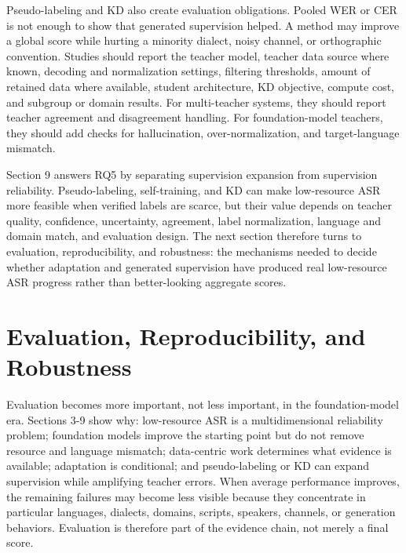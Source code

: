 \documentclass[pdflatex,sn-basic]{sn-jnl}
\theoremstyle{thmstyleone}
\theoremstyle{thmstyletwo}
\theoremstyle{thmstylethree}
\begin{document}
Pseudo-labeling and KD also create evaluation obligations. Pooled WER or CER is not enough to show that generated supervision helped. A method may improve a global score while hurting a minority dialect, noisy channel, or orthographic convention. Studies should report the teacher model, teacher data source where known, decoding and normalization settings, filtering thresholds, amount of retained data where available, student architecture, KD objective, compute cost, and subgroup or domain results. For multi-teacher systems, they should report teacher agreement and disagreement handling. For foundation-model teachers, they should add checks for hallucination, over-normalization, and target-language mismatch.

Section 9 answers RQ5 by separating supervision expansion from supervision reliability. Pseudo-labeling, self-training, and KD can make low-resource ASR more feasible when verified labels are scarce, but their value depends on teacher quality, confidence, uncertainty, agreement, label normalization, language and domain match, and evaluation design. The next section therefore turns to evaluation, reproducibility, and robustness: the mechanisms needed to decide whether adaptation and generated supervision have produced real low-resource ASR progress rather than better-looking aggregate scores.

\section{Evaluation, Reproducibility, and Robustness}

Evaluation becomes more important, not less important, in the foundation-model era. Sections 3-9 show why: low-resource ASR is a multidimensional reliability problem; foundation models improve the starting point but do not remove resource and language mismatch; data-centric work determines what evidence is available; adaptation is conditional; and pseudo-labeling or KD can expand supervision while amplifying teacher errors. When average performance improves, the remaining failures may become less visible because they concentrate in particular languages, dialects, domains, scripts, speakers, channels, or generation behaviors. Evaluation is therefore part of the evidence chain, not merely a final score.
\end{document}
